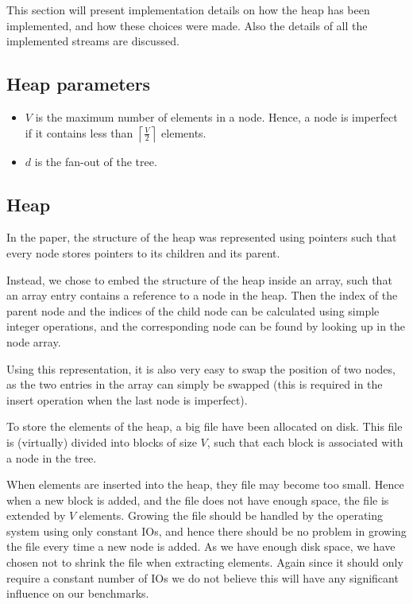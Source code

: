This section will present implementation details on how the heap has
been implemented, and how these choices were made. Also the details of
all the implemented streams are discussed.


\subsection{Heap parameters}
\label{sec:implementation:parameters}
\begin{itemize}
  \item $V$ is the maximum number of elements in a node. Hence, a
    node is imperfect if it contains less than $\left\lceil \frac{V}{2}
    \right\rceil$ elements.
  \item $d$ is the fan-out of the tree.
\end{itemize}

\subsection{Heap}
In the paper, the structure of the heap was represented using pointers
such that every node stores pointers to its children and its
parent.

Instead, we chose to embed the structure of the heap
inside an array, such that an array entry contains a reference to a
node in the heap. Then the index of the parent node and the indices of
the child node can be calculated using simple integer operations, and
the corresponding node can be found by looking up in the node array.


Using this representation, it is also very easy to swap the position
of two nodes, as the two entries in the array can simply be swapped
(this is required in the insert operation when the last node is
imperfect).

To store the elements of the heap, a big file have been allocated on
disk. This file is (virtually) divided into blocks of size $V$, such
that each block is associated with a node in the tree.

When elements are inserted into the heap, they file may become too
small. Hence when a new block is added, and the file does not have
enough space, the file is extended by $V$ elements. Growing the file
should be handled by the operating system using only constant IOs, and
hence there should be no problem in growing the file every time a new
node is added. As we have enough disk space, we have chosen not to
shrink the file when extracting elements. Again since it should only
require a constant number of IOs we do not believe this will have any
significant influence on our benchmarks.

